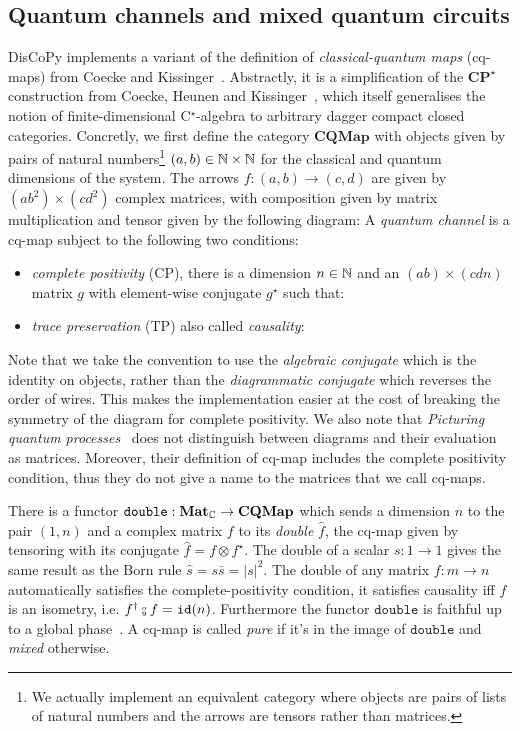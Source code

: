 
\subsection{Quantum channels and mixed quantum circuits}\label{section:mixed-circuits}

DisCoPy implements a variant of the definition of \emph{classical-quantum maps} (cq-maps) from Coecke and Kissinger~\cite[Chapter~8]{CoeckeKissinger17}.
Abstractly, it is a simplification of the $\mathbf{CP^\star}$ construction from Coecke, Heunen and Kissinger~\cite{CoeckeEtAl14a}, which itself generalises the notion of finite-dimensional C$^\star$-algebra to arbitrary dagger compact closed categories.
Concretly, we first define the category $\mathbf{CQMap}$ with objects given by pairs of natural numbers\footnote
{We actually implement an equivalent category where objects are pairs of lists of natural numbers and the arrows are tensors rather than matrices.} $(a, b) \in \mathbb{N} \times \mathbb{N}$ for the classical and quantum dimensions of the system.
The arrows $f : (a, b) \to (c, d)$ are given by $(a b^2) \times (c d^2)$ complex matrices, with composition given by matrix multiplication and tensor given by the following diagram:
A \emph{quantum channel} is a cq-map subject to the following two conditions:
\begin{itemize}
\item \emph{complete positivity} (CP), there is a dimension $n \in \mathbb{N}$ and an $(a b) \times (c d n)$ matrix $g$ with element-wise conjugate $g^\star$ such that:
\item \emph{trace preservation} (TP) also called \emph{causality}:
\end{itemize}
Note that we take the convention to use the \emph{algebraic conjugate} which is the identity on objects, rather than the \emph{diagrammatic conjugate} which reverses the order of wires.
This makes the implementation easier at the cost of breaking the symmetry of the diagram for complete positivity.
We also note that \emph{Picturing quantum processes}~\cite{CoeckeKissinger17} does not distinguish between diagrams and their evaluation as matrices.
Moreover, their definition of cq-map includes the complete positivity condition, thus they do not give a name to the matrices that we call cq-maps.

There is a functor $\mathtt{double} : \mathbf{Mat}_{\mathbb{C}} \to \mathbf{CQMap}$ which sends a dimension $n$ to the pair $(1, n)$ and a complex matrix $f$ to its \emph{double} $\widehat{f}$, the cq-map given by tensoring with its conjugate $\widehat{f} = f \otimes f^\star$.
The double of a scalar $s : 1 \to 1$ gives the same result as the Born rule $\hat{s} = s \bar{s} = \vert s \vert^2$.
The double of any matrix $f : m \to n$ automatically satisfies the complete-positivity condition, it satisfies causality iff $f$ is an isometry, i.e. $f^\dagger \fcmp f = \id(n)$.
Furthermore the functor $\mathtt{double}$ is faithful up to a global phase~\cite[Proposition~6.6]{CoeckeKissinger17}.
A cq-map is called \emph{pure} if it's in the image of $\mathtt{double}$ and \emph{mixed} otherwise.

